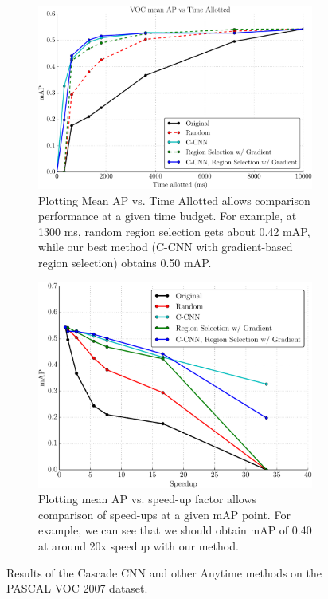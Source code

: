 \begin{figure}[ht]
\begin{subfigure}[b]{\linewidth}
    \centering
    \includegraphics[width=.75\linewidth]{figures/_apvst_final.pdf}
    \caption{
Plotting Mean AP vs. Time Allotted allows comparison performance at a given time budget.
For example, at 1300 ms, random region selection gets about 0.42 mAP, while our best method (C-CNN with gradient-based region selection) obtains 0.50 mAP.
}\label{fig:apvst}
\end{subfigure}
\begin{subfigure}[b]{\linewidth}
    \centering
    \includegraphics[width=.75\linewidth]{figures/_speedup_final_abs.pdf}
    \caption{
Plotting mean AP vs. speed-up factor allows comparison of speed-ups at a given mAP point.
For example, we can see that we should obtain mAP of 0.40 at around 20x speedup with our method.
}\label{fig:speedup}
\end{subfigure}
\caption{
Results of the Cascade CNN and other Anytime methods on the PASCAL VOC 2007 dataset.
}\label{fig:voc2007_results}
\end{figure}
